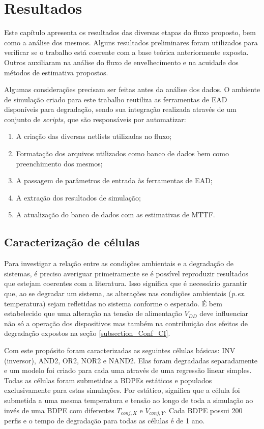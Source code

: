 \chapter{Resultados}
\label{section:Resultados}
Este capítulo apresenta os resultados das diversas etapas do fluxo proposto, bem como a análise dos mesmos. Alguns resultados preliminares foram utilizados para verificar se o trabalho está coerente com a base teórica anteriormente exposta. Outros auxiliaram na análise do fluxo de envelhecimento e na acuidade dos métodos de estimativa propostos.

Algumas considerações precisam ser feitas antes da análise dos dados. O ambiente de simulação criado para este trabalho reutiliza as ferramentas de EAD disponíveis para degradação, sendo sua integração realizada através de um conjunto de \textit{scripts}, que são responsáveis por automatizar:
\begin{enumerate}
	\item A criação das diversas netlists utilizadas no fluxo;
	\item Formatação dos arquivos utilizados como banco de dados bem como preenchimento dos mesmos;
	\item A passagem de parâmetros de entrada às ferramentas de EAD;
	\item A extração dos resultados de simulação;
	\item A atualização do banco de dados com as estimativas de MTTF.
\end{enumerate}

\section{Caracterização de células}
\label{section:caracterização}
Para investigar a relação entre as condições ambientais e a degradação de sistemas, é preciso averiguar primeiramente se é possível reproduzir resultados que estejam coerentes com a literatura. Isso significa que é necessário garantir que, ao se degradar um sistema, as alterações nas condições ambientais (\textit{p.ex.} temperatura) sejam refletidas no sistema conforme o esperado. É bem estabelecido que uma alteração na tensão de alimentação $V_{DD}$ deve influenciar não só a operação dos dispositivos mas também na contribuição dos efeitos de degradação expostos na seção \ref{subsection_Conf_CI}.

Com este propósito foram caracterizadas as seguintes células básicas: INV (inversor), AND2, OR2, NOR2 e NAND2. Elas foram degradadas separadamente e um modelo foi criado para cada uma através de uma regressão linear simples. Todas as células foram submetidas a BDPEs estáticos e populados exclusivamente para estas simulações. Por estático, significa que a célula foi submetida a uma mesma temperatura e tensão ao longo de toda a simulação ao invés de uma BDPE com diferentes $T_{conj,X}$ e $V_{conj,Y}$. Cada BDPE possui 200 perfis e o tempo de degradação para todas as células é de 1 ano.

